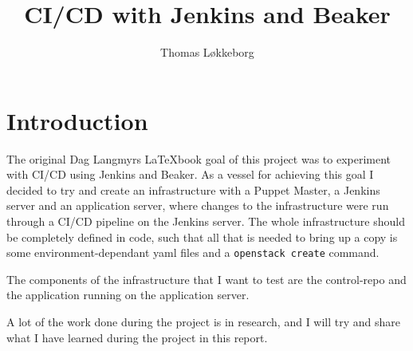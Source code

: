 

\title{CI/CD with Jenkins and Beaker}
\author{Thomas Løkkeborg} %



\maketitle


\thispagestyle{empty}

\clearpage
{}
\setcounter{page}{1}
\tableofcontents

\clearpage
{}

\section{Introduction}

The original Dag Langmyrs \LaTeX book \cite{Langmyr:03} goal of this project was to experiment with CI/CD using Jenkins and Beaker. As a vessel for achieving this goal I decided to try and create an infrastructure with a Puppet Master, a Jenkins server and an application server, where changes to the infrastructure were run through a CI/CD pipeline on the Jenkins server. The whole infrastructure should be completely defined in code, such that all that is needed to bring up a copy is some environment-dependant yaml files and a \texttt{openstack create} command.

The components of the infrastructure that I want to test are the control-repo and the application running on the application server.

A lot of the work done during the project is in research, and I will try and share what I have learned during the project in this report. 

